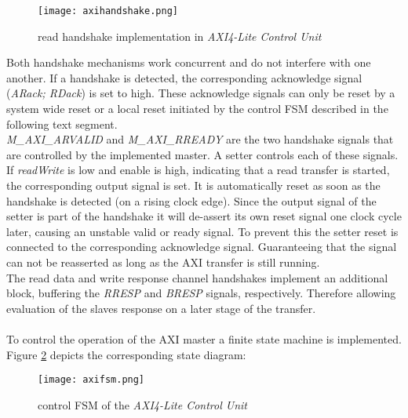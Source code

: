 \begin{figure}[H]
	\centering
	\texttt{[image: axihandshake.png]}
	\caption{read handshake implementation in \textit{AXI4-Lite Control Unit}}
	\label{fig:AXIhandshake}
\end{figure}

Both handshake mechanisms work concurrent and do not interfere with one another. If a handshake is detected, the corresponding acknowledge signal (\textit{ARack; RDack}) is set to high. These acknowledge signals can only be reset by a system wide reset or a local reset initiated by the control \ac{FSM} described in the following text segment.\\
\textit{M\_AXI\_ARVALID} and \textit{M\_AXI\_RREADY} are the two handshake signals that are controlled by the implemented master. A setter controls each of these signals. If \textit{readWrite} is low and enable is high, indicating that a read transfer is started, the corresponding output signal is set. It is automatically reset as soon as the handshake is detected (on a rising clock edge). Since the output signal of the setter is part of the handshake it will de-assert its own reset signal one clock cycle later, causing an unstable valid or ready signal. To prevent this the setter reset is connected to the corresponding acknowledge signal. Guaranteeing that the signal can not be reasserted as long as the \ac{AXI} transfer is still running.\\
The read data and write response channel handshakes implement an additional block, buffering the \textit{RRESP} and \textit{BRESP} signals, respectively. Therefore allowing evaluation of the slaves response on a later stage of the transfer.\\
\\
To control the operation of the \ac{AXI} master a finite state machine is implemented. Figure \ref{fig:axifsm} depicts the corresponding state diagram:

\begin{figure}[H]
	\centering
	\texttt{[image: axifsm.png]}
	\caption{control \ac{FSM} of the \textit{AXI4-Lite Control Unit}}
	\label{fig:axifsm}
\end{figure}

